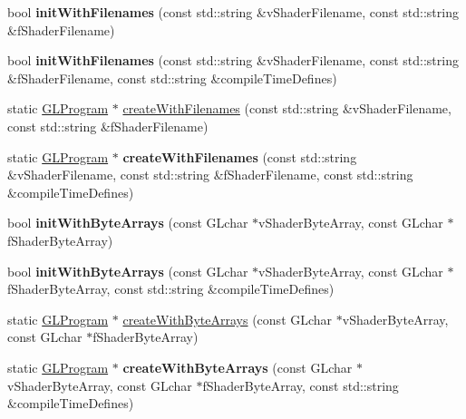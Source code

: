 \begin{DoxyCompactItemize}
\item 
\mbox{\label{classGLProgram_a17041a8230ff0ce1c110f05c3f0382c6}} 
bool {\bfseries init\+With\+Filenames} (const std\+::string \&v\+Shader\+Filename, const std\+::string \&f\+Shader\+Filename)
\item 
\mbox{\label{classGLProgram_ab76c957339e44229565377ec53f3e467}} 
bool {\bfseries init\+With\+Filenames} (const std\+::string \&v\+Shader\+Filename, const std\+::string \&f\+Shader\+Filename, const std\+::string \&compile\+Time\+Defines)
\item 
static \hyperlink{classGLProgram}{G\+L\+Program} $\ast$ \hyperlink{classGLProgram_a0e7f81b7ee96828bad102f57dd3cc309}{create\+With\+Filenames} (const std\+::string \&v\+Shader\+Filename, const std\+::string \&f\+Shader\+Filename)
\item 
\mbox{\label{classGLProgram_ab8b400e0fc9e70a71eb1125d83f9cd1d}} 
static \hyperlink{classGLProgram}{G\+L\+Program} $\ast$ {\bfseries create\+With\+Filenames} (const std\+::string \&v\+Shader\+Filename, const std\+::string \&f\+Shader\+Filename, const std\+::string \&compile\+Time\+Defines)
\end{DoxyCompactItemize}
\begin{DoxyCompactItemize}
\item 
\mbox{\label{classGLProgram_a8aa8255b8b44db4116d0feff3147da00}} 
bool {\bfseries init\+With\+Byte\+Arrays} (const G\+Lchar $\ast$v\+Shader\+Byte\+Array, const G\+Lchar $\ast$f\+Shader\+Byte\+Array)
\item 
\mbox{\label{classGLProgram_a65e771537335d8c70e17f183d99dbf01}} 
bool {\bfseries init\+With\+Byte\+Arrays} (const G\+Lchar $\ast$v\+Shader\+Byte\+Array, const G\+Lchar $\ast$f\+Shader\+Byte\+Array, const std\+::string \&compile\+Time\+Defines)
\item 
static \hyperlink{classGLProgram}{G\+L\+Program} $\ast$ \hyperlink{classGLProgram_afa4e0cd4555d39d4f8e31d866a2db1f7}{create\+With\+Byte\+Arrays} (const G\+Lchar $\ast$v\+Shader\+Byte\+Array, const G\+Lchar $\ast$f\+Shader\+Byte\+Array)
\item 
\mbox{\label{classGLProgram_ab1fca5f260a4a0549171db45f95b324a}} 
static \hyperlink{classGLProgram}{G\+L\+Program} $\ast$ {\bfseries create\+With\+Byte\+Arrays} (const G\+Lchar $\ast$v\+Shader\+Byte\+Array, const G\+Lchar $\ast$f\+Shader\+Byte\+Array, const std\+::string \&compile\+Time\+Defines)
\end{DoxyCompactItemize}
